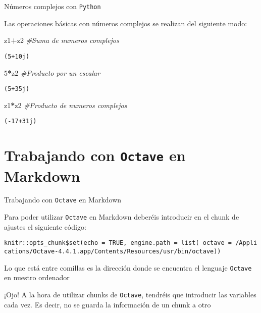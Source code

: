 \documentclass[
  ignorenonframetext,
]{beamer}
\newenvironment{Shaded}{\begin{snugshade}}{\end{snugshade}}
\newcommand{\CommentTok}[1]{\textcolor[rgb]{0.56,0.35,0.01}{\textit{#1}}}
\newcommand{\DecValTok}[1]{\textcolor[rgb]{0.00,0.00,0.81}{#1}}
\newcommand{\NormalTok}[1]{#1}
\newcommand{\OperatorTok}[1]{\textcolor[rgb]{0.81,0.36,0.00}{\textbf{#1}}}
\begin{document}
\begin{frame}[fragile]{Números complejos con \texttt{Python}}
\protect\hypertarget{nuxfameros-complejos-con-python-7}{}

Las operaciones básicas con números complejos se realizan del siguiente
modo:

\begin{Shaded}
\begin{Highlighting}[]
\NormalTok{z1}\OperatorTok{+}\NormalTok{z2 }\CommentTok{#Suma de numeros complejos}
\end{Highlighting}
\end{Shaded}

\begin{verbatim}
(5+10j)
\end{verbatim}

\begin{Shaded}
\begin{Highlighting}[]
\DecValTok{5}\OperatorTok{*}\NormalTok{z2 }\CommentTok{#Producto por un escalar}
\end{Highlighting}
\end{Shaded}

\begin{verbatim}
(5+35j)
\end{verbatim}

\begin{Shaded}
\begin{Highlighting}[]
\NormalTok{z1}\OperatorTok{*}\NormalTok{z2 }\CommentTok{#Producto de numeros complejos}
\end{Highlighting}
\end{Shaded}

\begin{verbatim}
(-17+31j)
\end{verbatim}

\end{frame}

\hypertarget{trabajando-con-octave-en-markdown}{%
\section{\texorpdfstring{Trabajando con \texttt{Octave} en
Markdown}{Trabajando con Octave en Markdown}}\label{trabajando-con-octave-en-markdown}}

\begin{frame}[fragile]{Trabajando con \texttt{Octave} en Markdown}
\protect\hypertarget{trabajando-con-octave-en-markdown-1}{}

Para poder utilizar \texttt{Octave} en Markdown deberéis introducir en
el chunk de ajustes el siguiente código:

\texttt{knitr::opts\_chunk\$set(echo\ =\ TRUE,\ engine.path\ =\ list(\ octave\ =\ \textquotesingle{}/Applications/Octave-4.4.1.app/Contents/Resources/usr/bin/octave\textquotesingle{}))}

Lo que está entre comillas es la dirección donde se encuentra el
lenguaje \texttt{Octave} en nuestro ordenador

¡Ojo! A la hora de utilizar chunks de \texttt{Octave}, tendréis que
introducir las variables cada vez. Es decir, no se guarda la información
de un chunk a otro

\end{frame}
\end{document}
